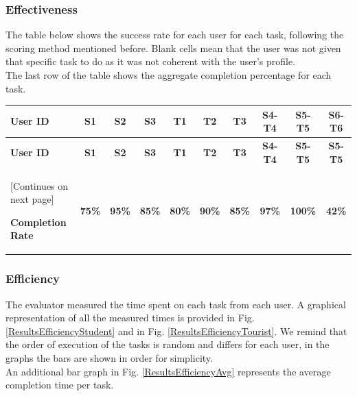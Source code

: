 \subsubsection{Effectiveness}
    The table below shows the success rate for each user for each task, following the scoring method mentioned before. Blank cells mean that the user was not given that specific task to do as it was not coherent with the user's profile.\\
    The last row of the table shows the aggregate completion percentage for each task.
    \begin{tabularx}{\linewidth}{l|c|c|c|c|c|c|c|c|c}
    \toprule
    \textbf{User ID} & \textbf{S1} & \textbf{S2} & \textbf{S3} & \textbf{T1} & \textbf{T2} & \textbf{T3} & \textbf{S4-T4} & \textbf{S5-T5} & \textbf{S6-T6} \\
    \midrule
    \endfirsthead
    \toprule
    \textbf{User ID} & \textbf{S1} & \textbf{S2} & \textbf{S3} & \textbf{T1} & \textbf{T2} & \textbf{T3} & \textbf{S4-T4} & \textbf{S5-T5} & \textbf{S5-T5} \\
    \hline
    \endhead
    \midrule
    \footnotesize [Continues on next page]
    \endfoot
    \bottomrule
    \endlastfoot

        \textbf{Completion Rate} & \textbf{75\%} & \textbf{95\%} & \textbf{85\%} & \textbf{80\%} & \textbf{90\%} & \textbf{85\%} & \textbf{97\%} & \textbf{100\%} & \textbf{42\%}
    \end{tabularx}

\subsubsection{Efficiency}
    The evaluator measured the time spent on each task from each user. A graphical representation of all the measured times is provided in Fig. \ref{ResultsEfficiencyStudent} and in Fig. \ref{ResultsEfficiencyTourist}. We remind that the order of execution of the tasks is random and differs for each user, in the graphs the bars are shown in order for simplicity.\\
    An additional bar graph in Fig. \ref{ResultsEfficiencyAvg} represents the average completion time per task.

